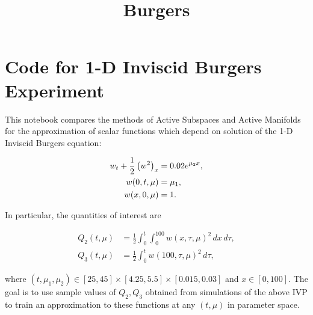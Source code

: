 \documentclass[11pt]{article}
\title{Burgers}
\begin{document}
    
    
    \maketitle
    
    

    
    \hypertarget{code-for-1-d-inviscid-burgers-experiment}{%
\section{Code for 1-D Inviscid Burgers
Experiment}\label{code-for-1-d-inviscid-burgers-experiment}}

    This notebook compares the methods of Active Subspaces and Active
Manifolds for the approximation of scalar functions which depend on
solution of the 1-D Inviscid Burgers equation:

\[ \begin{align}\label{eq:mainsystem}
\begin{split}
    w_t + \frac{1}{2}\left(w^2\right)_x &= 0.02e^{\mu_2 x}, \\
    w(0, t, \bf{\mu}) &= \mu_1, \\
    w(x,0,\bf{\mu}) &= 1.
\end{split}
\end{align} \]

In particular, the quantities of interest are

\[ \begin{align*}
    Q_2(t, \mu) &= \frac{1}{2}\int_0^t \int_0^{100} w(x,\tau,\mu)^2 \,dx\,d\tau, \\
    Q_3(t,\mu) &= \frac{1}{2}\int_0^t w(100,\tau,\mu)^2\,d\tau,
\end{align*} \]

where
\((t, \mu_1, \mu_2) \in [25, 45] \times [4.25, 5.5] \times [0.015, 0.03]\)
and \(x\in [0,100]\). The goal is to use sample values of \(Q_2, Q_3\)
obtained from simulations of the above IVP to train an approximation to
these functions at any \((t, \mu)\) in parameter space.
\end{document}
